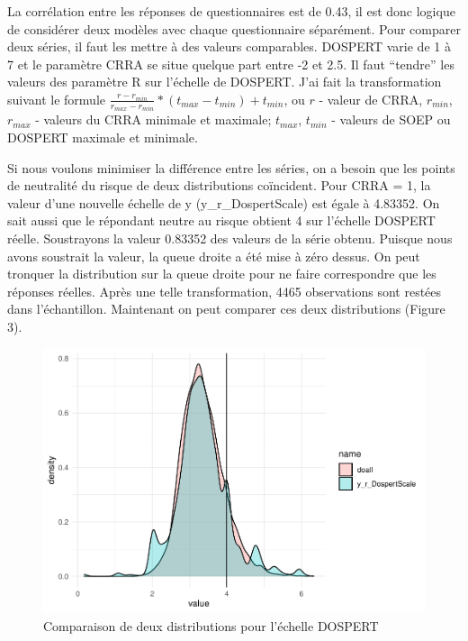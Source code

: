 \documentclass[12pt]{article}
\begin{document}
La corrélation entre les réponses de questionnaires est de 0.43, il est
donc logique de considérer deux modèles avec chaque questionnaire
séparément. Pour comparer deux séries, il faut les mettre à des valeurs
comparables. DOSPERT varie de 1 à 7 et le paramètre CRRA se situe
quelque part entre -2 et 2.5. Il faut ``tendre'' les valeurs des
paramètre R sur l'échelle de DOSPERT. J'ai fait la transformation
suivant le formule
\(\frac{r - r_{min}}{r_{max} - r_{min}} * (t_{max} - t_{min}) + t_{min}\),
ou \(r\) - valeur de CRRA, \(r_{min}\), \(r_{max}\) - valeurs du CRRA
minimale et maximale; \(t_{max}\), \(t_{min}\) - valeurs de SOEP ou
DOSPERT maximale et minimale.

Si nous voulons minimiser la différence entre les séries, on a besoin
que les points de neutralité du risque de deux distributions coïncident.
Pour CRRA = 1, la valeur d'une nouvelle échelle de y
(y\_r\_DospertScale) est égale à 4.83352. On sait aussi que le répondant
neutre au risque obtient 4 sur l'échelle DOSPERT réelle. Soustrayons la
valeur 0.83352 des valeurs de la série obtenu. Puisque nous avons
soustrait la valeur, la queue droite a été mise à zéro dessus. On peut
tronquer la distribution sur la queue droite pour ne faire correspondre
que les réponses réelles. Après une telle transformation, 4465
observations sont restées dans l'échantillon. Maintenant on peut
comparer ces deux distributions (Figure 3).

\begin{figure}
\centering
\includegraphics{Report-de-stage_files/figure-latex/distdospert-1}
\caption{Comparaison de deux distributions pour l'échelle DOSPERT}
\end{figure}
\end{document}
